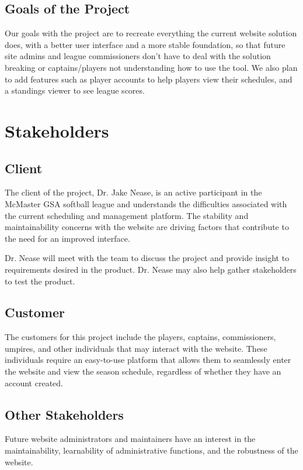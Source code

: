 \documentclass[12pt]{article}
\begin{document}
\subsection{Goals of the Project}
Our goals with the project are to recreate everything the current website
solution does, with a better user interface and a more stable foundation, so
that future site admins and league commissioners don't have to deal with the
solution breaking or captains/players not understanding how to use the tool.
We also plan to add features such as player accounts to help players view
their schedules, and a standings viewer to see league scores.

\section{Stakeholders}
\subsection{Client}

The client of the project, Dr. Jake Nease, is an active participant in the
McMaster GSA softball league and understands the difficulties associated with
the current scheduling and management platform. The stability and maintainability
concerns with the website are driving factors that contribute to the need for
an improved interface.

Dr. Nease will meet with the team to discuss the project and provide insight
to requirements desired in the product. Dr. Nease may also help gather
stakeholders to test the product.

\subsection{Customer}

The customers for this project include the players, captains, commissioners,
umpires, and other individuals that may interact with the website. These
individuals require an easy-to-use platform that allows them to seamlessly
enter the website and view the season schedule, regardless of whether they have an
account created. 

\subsection{Other Stakeholders}

Future website administrators and maintainers have an interest in the
maintainability, learnability of administrative functions, and the robustness
of the website.
\end{document}
